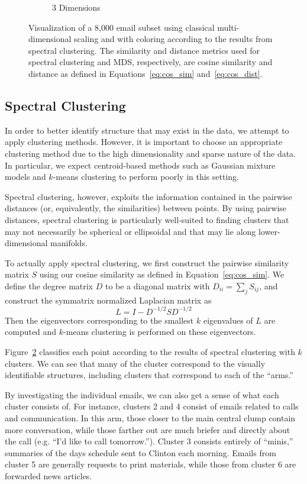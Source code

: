 \documentclass[12pt]{article}
\theoremstyle{definition}
\theoremstyle{algodesc}
\begin{document}
\begin{figure}[htbp]
\begin{subfigure}[t]{.7\linewidth}
    \caption{3 Dimensions} \label{fig:cluster:3d}
  \end{subfigure}
  \caption{Visualization of a 8,000 email subset using classical multi-dimensional scaling and with coloring according to the results from spectral clustering. The similarity and distance metrics used for spectral clustering and MDS, respectively, are cosine similarity and distance as defined in Equations~\ref{eq:cos_sim} and~\ref{eq:cos_dist}.}
  \label{fig:cluster}
\end{figure}


\subsection{Spectral Clustering}
In order to better identify structure that may exist in the data, we attempt to apply clustering methods. However, it is important to choose an appropriate clustering method due to the high dimensionality and sparse nature of the data. In particular, we expect centroid-based methods such as Gaussian mixture models and $k$-means clustering to perform poorly in this setting.

Spectral clustering, however, exploits the information contained in the pairwise distances (or, equivalently, the similarities) between points. By using pairwise distances, spectral clustering is particularly well-suited to finding clusters that may not necessarily be spherical or ellipsoidal and that may lie along lower-dimensional manifolds.

To actually apply spectral clustering, we first construct the pairwise similarity matrix $S$ using our cosine similarity as defined in Equation~\ref{eq:cos_sim}. We define the degree matrix $D$ to be a diagonal matrix with $D_{ii} = \sum_j S_{ij}$, and construct the symmatrix normalized Laplacian matrix as
\begin{equation} \label{eq:laplacian}
L = I - D^{-1/2} S D^{-1/2}
\end{equation}
Then the eigenvectors corresponding to the smallest $k$ eigenvalues of $L$ are computed and $k$-means clustering is performed on these eigenvectors.

Figure~\ref{fig:cluster} classifies each point according to the results of spectral clustering with $k$ clusters. We can see that many of the cluster correspond to  the visually identifiable structures, including clusters that correspond to each of the ``arms.''

By investigating the individual emails, we can also get a sense of what each cluster consists of. For instance, clusters 2 and 4 consist of emails related to calls and communication. In this arm, those closer to the main central clump contain more conversation, while those farther out are much briefer and directly about the call (e.g. ``I'd like to call tomorrow.''). Cluster 3 consists entirely of ``minis,'' summaries of the days schedule sent to Clinton each morning. Emails from cluster 5 are generally requests to print materials, while those from cluster 6 are forwarded news articles.
\end{document}
